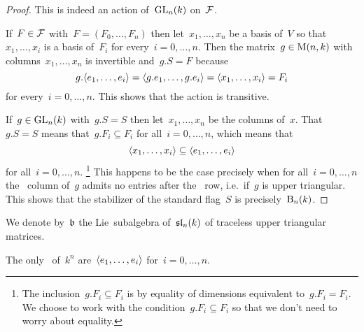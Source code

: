 \begin{proof}
  This is indeed an action of~$\operatorname{GL}_n(k)$ on~$\mathcal{F}$.
  
  If~$F \in \mathcal{F}$ with~$F = (F_0, \dotsc, F_n)$ then let~$x_1, \dotsc, x_n$ be a basis of~$V$ so that~$x_1, \dotsc, x_i$ is a basis of~$F_i$ for every~$i = 0, \dotsc, n$.
  Then the matrix~$g \in \operatorname{M}(n, k)$ with columns~$x_1, \dotsc, x_n$ is invertible and~$g.S = F$ because
  \[
    g.\langle e_1, \dotsc, e_i\rangle
    =
    \langle g.e_1, \dotsc, g.e_i\rangle
    =
    \langle x_1, \dotsc, x_i\rangle
    =
    F_i
  \]
  for every~$i = 0, \dotsc, n$.
  This shows that the action is transitive.
  
  If~$g \in \operatorname{GL}_n(k)$ with~$g.S = S$ then let~$x_1, \dotsc, x_n$ be the columns of~$x$.
  That~$g.S = S$ means that~$g.F_i \subseteq F_i$ for all~$i = 0, \dotsc, n$, which means that
  \[
    \langle x_1, \dotsc, x_i\rangle
    \subseteq
    \langle e_1, \dotsc, e_i\rangle
  \]
  for all~$i = 0, \dotsc, n$.%
  \footnote{The inclusion~$g.F_i \subseteq F_i$ is by equality of dimensions equivalent to~$g.F_i = F_i$.
  We choose to work with the condition~$g.F_i \subseteq F_i$ so that we don’t need to worry about equality.}
  This happens to be the case precisely when for all~$i = 0, \dotsc, n$ the~{} column of~$g$ admits no entries after the~{} row, i.e.\ if~$g$ is upper triangular.
  This shows that the stabilizer of the standard flag~$S$ is precisely~$\operatorname{B}_n(k)$.
\end{proof}

We denote by~$\blie$ the Lie~subalgebra of~$\mathfrak{sl}_n(k)$ of traceless upper triangular matrices.

\begin{lemma}
  \label{borel invariant subspaces}
  The only~{\subrepresentations{$\blie$}} of~$k^n$ are~$\langle e_1, \dotsc, e_i\rangle$ for~$i = 0, \dotsc, n$.
\end{lemma}

